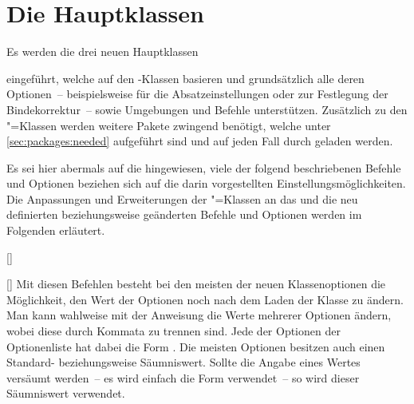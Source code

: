 \chapter[%
  Die Hauptklassen \Class*{tudscrbook}, \Class*{tudscrreprt} und 
  \Class*{tudscrartcl}%
]{Die Hauptklassen}
%
%
%
%
\begin{Declaration*}{}
\begin{Declaration*}{}
\begin{Declaration*}{}
Es werden die drei neuen Hauptklassen
%
\begin{description}
\item {}
\item {}
\item {}
\end{description}
%
eingeführt, welche auf den \KOMAScript-Klassen basieren und grundsätzlich alle 
deren Optionen~-- beispielsweise  für die 
Absatzeinstellungen oder  zur Festlegung der 
Bindekorrektur~-- sowie Umgebungen und Befehle unterstützen. Zusätzlich zu den 
\KOMAScript"=Klassen werden weitere Pakete zwingend benötigt, welche unter 
\autoref{sec:packages:needed} aufgeführt sind und auf jeden Fall durch 
\TUDScript geladen werden.

Es sei hier abermals auf die  
hingewiesen, viele der folgend beschriebenen Befehle und Optionen beziehen sich 
auf die darin vorgestellten Einstellungsmöglichkeiten. Die Anpassungen und 
Erweiterungen der \KOMAScript"=Klassen an das \CD und die neu definierten 
beziehungsweise geänderten Befehle und Optionen werden im Folgenden erläutert.

\begin{Declaration}{[]}
\begin{Declaration}{[]}
\printdeclarationlist%
%
%
Mit diesen Befehlen besteht bei den meisten der neuen Klassenoptionen die 
Möglichkeit, den Wert der Optionen noch nach dem Laden der Klasse zu ändern.
Man kann wahlweise mit der Anweisung  die Werte mehrerer 
Optionen ändern, wobei diese durch Kommata zu trennen sind. Jede der Optionen 
der Optionenliste hat dabei die Form \PValue{=}. Die 
meisten Optionen besitzen auch einen Standard- beziehungsweise Säumniswert. 
Sollte die Angabe eines Wertes versäumt werden~-- es wird einfach die Form 
 verwendet~-- so wird dieser Säumniswert verwendet.


\end{Declaration}
\end{Declaration}
\end{Declaration*}
\end{Declaration*}
\end{Declaration*}
